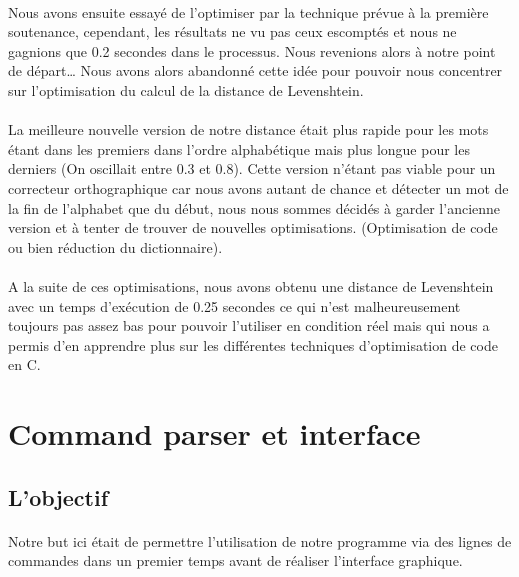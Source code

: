 \documentclass{article}
\begin{document}
\paragraph{}Nous avons ensuite essayé de l’optimiser par la technique prévue à la première soutenance, cependant, les résultats ne vu pas ceux escomptés et nous ne gagnions que 0.2 secondes dans le processus. Nous revenions alors à notre point de départ… Nous avons alors abandonné cette idée pour pouvoir nous concentrer sur l’optimisation du calcul de la distance de Levenshtein.
\paragraph{}La meilleure nouvelle version de notre distance était plus rapide pour les mots étant dans les premiers dans l’ordre alphabétique mais plus longue pour les derniers (On oscillait entre 0.3 et 0.8). Cette version n’étant pas viable pour un correcteur orthographique car nous avons autant de chance et détecter un mot de la fin de l’alphabet que du début, nous nous sommes décidés à garder l’ancienne version et à tenter de trouver de nouvelles optimisations.  (Optimisation de code ou bien réduction du dictionnaire).
\paragraph{}A la suite de ces optimisations, nous avons obtenu une distance de Levenshtein avec un temps d’exécution de 0.25 secondes ce qui n’est malheureusement toujours pas assez bas pour pouvoir l’utiliser en condition réel mais qui nous a permis d’en apprendre plus sur les différentes techniques d’optimisation de code en C.


\newpage
{}
\section{Command parser et interface}

\subsection{L'objectif}

\paragraph{}Notre but ici était de permettre l'utilisation de notre programme via des lignes de commandes dans un premier temps avant de réaliser l'interface graphique.
\end{document}
